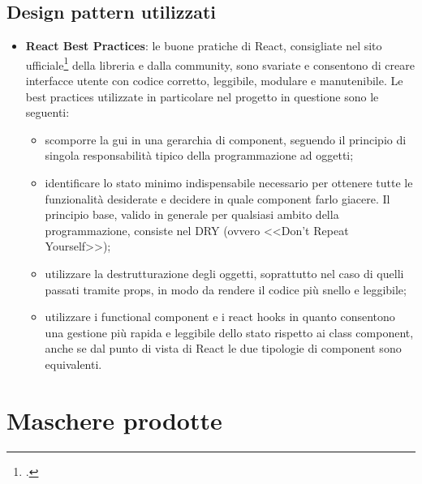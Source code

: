 \subsection{Design pattern utilizzati}
\begin{itemize}
	\item \textbf{React Best Practices}: le buone pratiche di React, consigliate nel sito ufficiale\footcite{react-best-practices} della libreria e dalla community, sono svariate e consentono di creare interfacce utente con codice corretto, leggibile, modulare e manutenibile. Le best practices utilizzate in particolare nel progetto in questione sono le seguenti:
	\begin{itemize}
		\item scomporre la \gls{gui} in una \textsf{gerarchia di component}, seguendo il principio di singola responsabilità tipico della programmazione ad oggetti;
		\item identificare lo \textsf{stato minimo indispensabile} necessario per ottenere tutte le funzionalità desiderate e decidere in quale component farlo giacere. Il principio base, valido in generale per qualsiasi ambito della programmazione, consiste nel DRY (ovvero <<Don't Repeat Yourself>>);
		\item utilizzare la \textsf{destrutturazione degli oggetti}, soprattutto nel caso di quelli passati tramite props, in modo da rendere il codice più snello e leggibile;
		\item utilizzare i \textsf{functional component} e i \textsf{react hooks} in quanto consentono una gestione più rapida e leggibile dello stato rispetto ai class component, anche se dal punto di vista di React le due tipologie di component sono equivalenti.
	\end{itemize}
\end{itemize}


\section{Maschere prodotte}

